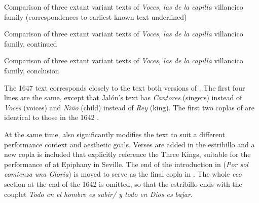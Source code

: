 \begin{table}
    \caption{Comparison of three extant variant texts of \emph{Voces, las de la
    capilla} villancico family (correspondences to earliest known text
    underlined)}

    \label{tab:Voces-versions-1}

\end{table}

\begin{table}
    \caption{Comparison of three extant variant texts of \emph{Voces, las de la
    capilla} villancico family, continued}

    \label{tab:Voces-versions-2}

\end{table}

\begin{table}
    \caption{Comparison of three extant variant texts of \emph{Voces, las de la
    capilla} villancico family, conclusion}

    \label{tab:Voces-versions-3}

\end{table}



The 1647  text corresponds closely to the text both versions of
.
The first four lines are the same, except that Jalón's text has \emph{Cantores}
(singers) instead of \emph{Voces} (voices) and \emph{Niño} (child) instead of
\emph{Rey} (king).
The first two coplas of  are identical to those in the 1642
.

At the same time,  also significantly modifies the text to suit
a different performance context and aesthetic goals.
Verses are added in the estribillo and a new copla is included that explicitly
reference the Three Kings, suitable for the performance of  at
Epiphany in Seville.
The end of the introduction in  (\emph{Por sol comienza una
Gloria}) is moved to serve as the final copla in .
The whole \emph{eco} section at the end of the 1642  is omitted,
so that the estribillo ends with the couplet \emph{Todo en el hombre es subir/ y
todo en Dios es bajar}.

